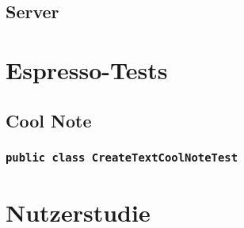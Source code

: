 \documentclass[a4paper]{scrreprt}
\begin{document}
	\section{Server}
	
	\chapter{Espresso-Tests}
	\section{Cool Note}
	\subsection{\texttt{public class CreateTextCoolNoteTest}}
	
	\chapter{Nutzerstudie}
	
\end{document}
